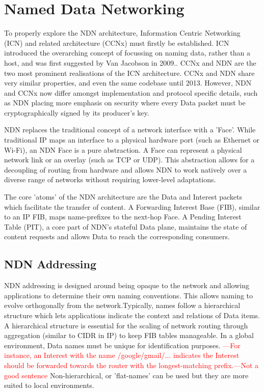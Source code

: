 \documentclass[12pt]{report}
\newcommand{\R}{\textcolor{red}}
\begin{document}
\section{Named Data Networking}
To properly explore the NDN architecture, Information Centric Networking (ICN) and related architecture (CCNx) must firstly be established. ICN introduced the overarching concept of focussing on naming data, rather than a host, and was first suggested by Van Jacobson in 2009.\cite{jacobson_networking_2009}. CCNx and NDN are the two most prominent realisations of the ICN architecture. CCNx and NDN share very similar properties, and even the same codebase until 2013\cite{noauthor_ndn_nodate}. However, NDN and CCNx now differ amongst implementation and protocol specific details, such as NDN placing more emphasis on security where every Data packet must be cryptographically signed by its producer's key.\cite{amuda_revolutionizing_2024}



NDN replaces the traditional concept of a network interface with a 'Face'. While  traditional IP maps an interface to a physical hardware port (such as Ethernet or Wi-Fi), an NDN Face is a pure abstraction. A Face can represent a physical network link or an overlay (such as TCP or UDP). This abstraction allows for a decoupling of routing from hardware and allows NDN to work natively over a diverse range of networks without requiring lower-level adaptations.



The core 'atoms' of the NDN architecture are the Data and Interest packets which facilitate the transfer of content. A Forwarding Interest Base (FIB), similar to an IP FIB, maps name-prefixes to the next-hop Face. A Pending Interest Table (PIT), a core part of NDN's stateful Data plane, maintains the state of content requests and allows Data to reach the corresponding consumers.

\subsection{NDN Addressing}
NDN addressing is designed around being opaque to the network and allowing applications to determine their own naming conventions. This allows naming to evolve orthogonally from the network.\cite{zhang_named_2014}Typically, names follow a hierarchical structure which lets applications indicate the context and relations of Data items. A hierarchical structure is essential for the scaling of network routing through aggregation (similar to CIDR in IP) to keep FIB tables manageable. In a global environment, Data names must be unique for identification purposes. \R{---For instance, an Interest with the name /google/gmail/... indicates the Interest should be forwarded towards the router with the longest-matching prefix.---Not a good sentence} Non-hierarchical, or 'flat-names' can be used but they are more suited to local environments. 
\end{document}

